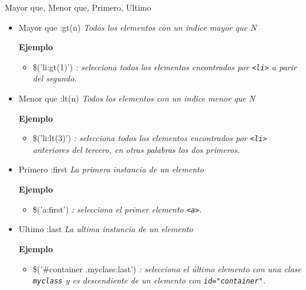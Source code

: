 \begin{frame}[fragile]{Mayor que,  Menor que, Primero, Ultimo} %
\begin{itemize}
    \item Mayor que :gt(n) \textit{Todos los elementos con un indice mayor que N}

        \textbf{Ejemplo}
        \begin{itemize}
            \item \$('li:gt(1)') \textit{: selecciona todos los elementos
        encontrados por \texttt{<li>} a parir del segundo.}
        \end{itemize}
    \item Menor que :lt(n) \textit{Todos los elementos con un indice menor que N}

        \textbf{Ejemplo}
        \begin{itemize}
            \item \$('li:lt(3)') \textit{: selecciona todos los elementos
            encontrados por \texttt{<li>} anteriores del tercero,  en otras palabras los dos primeros.}
        \end{itemize}
    \item Primero :first \textit{La primera instancia de un elemento}

        \textbf{Ejemplo}
        \begin{itemize}
            \item \$('a:first') \textit{: selecciona el primer elemento \texttt{<a>}.}
        \end{itemize}
    \item Ultimo :last \textit{La ultima instancia de un elemento}

        \textbf{Ejemplo}
        \begin{itemize}
            \item \$('\#container .myclass:last') \textit{: selecciona el último elemento con una clase \texttt{myclass} y es descendiente de un
        elemento con \texttt{id="container"}.}
        \end{itemize}
\end{itemize}
\end{frame}


